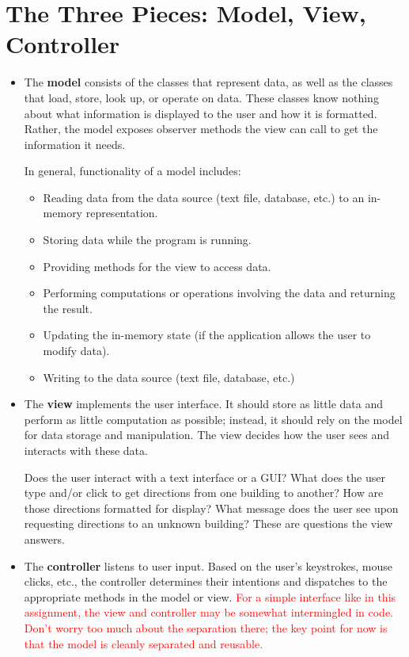 \documentclass[11pt]{article}
\begin{document}
\section*{The Three Pieces: Model, View, Controller}
\label{sec:The Three Pieces}

\begin{itemize}
\item The \textbf{model} consists of the classes that represent data, as well as the classes that load, store, look up, or operate on data. These classes know nothing about what information is displayed to the user and how it is formatted. Rather, the model exposes observer methods the view can call to get the information it needs.

In general, functionality of a model includes:
\begin{itemize}
\item Reading data from the data source (text file, database, etc.) to an in-memory representation.
\item Storing data while the program is running.
\item Providing methods for the view to access data.
\item Performing computations or operations involving the data and returning the result.
\item Updating the in-memory state (if the application allows the user to modify data).
\item Writing to the data source (text file, database, etc.)
\end{itemize}
\item The \textbf{view} implements the user interface. It should store as little data and perform as little computation as possible; instead, it should rely on the model for data storage and manipulation. The view decides how the user sees and interacts with these data.

Does the user interact with a text interface or a GUI? What does the user type and/or click to get directions from one building to another? How are those directions formatted for display? What message does the user see upon requesting directions to an unknown building? These are questions the view answers.

\item The \textbf{controller} listens to user input. Based on the user's keystrokes, mouse clicks, etc., the controller determines their intentions and dispatches to the appropriate methods in the model or view.
\textcolor{red}{For a simple interface like in this assignment, the view and controller may be somewhat intermingled in code. Don't worry too much about the separation there; the key point for now is that the model is cleanly separated and reusable.}
\end{itemize}
\end{document}
